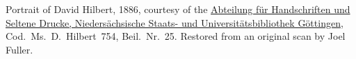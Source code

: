 Portrait of David Hilbert, 1886, courtesy of
the \href{http://www.sub.uni-goettingen.de/en/contact/departments-a-z/departmental-and-unit-details/abteilunggruppe/handschriften-und-seltene-drucke/}{Abteilung
f\"ur Handschriften und Seltene Drucke, Nieders\"achsische Staats- und
Universit\"atsbibliothek G\"ottingen}, Cod.\ Ms.\ D.~Hilbert~754,
Beil.\ Nr.~25. Restored from an original scan by Joel Fuller.
